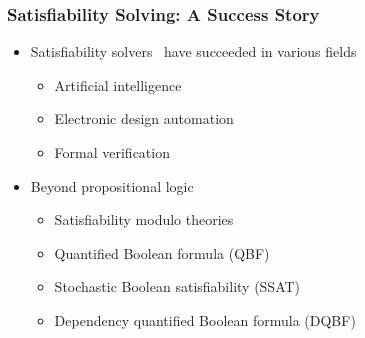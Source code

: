 \begin{frame}
      \frametitle{Satisfiability Solving: A Success Story}
      \begin{itemize}
            \item Satisfiability solvers~\cite{SATHandbook} have succeeded in various fields
                  \pause
                  \begin{itemize}
                        \item Artificial intelligence~\cite{Nilsson2014,Russell2020}
                              \pause
                        \item Electronic design automation~\cite{Marques2000,Wang2009}
                              \pause
                        \item Formal verification~\cite{Berard2013,Jhala2009}
                  \end{itemize}
                  \pause
            \item Beyond propositional logic
                  \pause
                  \begin{itemize}
                        \item Satisfiability modulo theories~\cite{Moura2011,HBMC-SMT}
                              \pause
                        \item Quantified Boolean formula (QBF)~\cite{Narizzano2006,SATHandbook-QBF}
                              \pause
                        \item Stochastic Boolean satisfiability (SSAT)~\cite{Littman2001,SATHandbook-SSAT}
                              \pause
                        \item Dependency quantified Boolean formula (DQBF)~\cite{Balabanov2014,Scholl2018}
                  \end{itemize}
      \end{itemize}
\end{frame}

